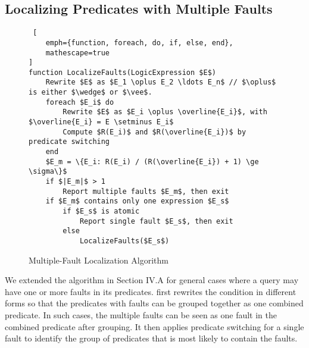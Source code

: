 \subsection{Localizing Predicates with Multiple Faults}

\begin{figure}[t]
    \centering
\begin{lstlisting} [
    emph={function, foreach, do, if, else, end},
	mathescape=true
]
function LocalizeFaults(LogicExpression $E$)
    Rewrite $E$ as $E_1 \oplus E_2 \ldots E_n$ // $\oplus$ is either $\wedge$ or $\vee$.
    foreach $E_i$ do
        Rewrite $E$ as $E_i \oplus \overline{E_i}$, with $\overline{E_i} = E \setminus E_i$
        Compute $R(E_i)$ and $R(\overline{E_i})$ by predicate switching
    end
    $E_m = \{E_i: R(E_i) / (R(\overline{E_i}) + 1) \ge \sigma\}$
    if $|E_m|$ > 1
        Report multiple faults $E_m$, then exit
    if $E_m$ contains only one expression $E_s$
        if $E_s$ is atomic
            Report single fault $E_s$, then exit
        else
            LocalizeFaults($E_s$)
\end{lstlisting}
     \caption{Multiple-Fault Localization Algorithm}
     \label{fig:algorithm-multiplefaults}
\end{figure}


We extended the algorithm in Section IV.A for general cases
where a query may have one or more faults in its
predicates. \tool{} first rewrites the  condition
in different forms so that the predicates with faults can be grouped
together as one combined predicate. In such cases, the multiple faults
can be seen as one fault in the combined predicate after grouping. It
then applies predicate switching for a single fault to identify the
group of predicates that is most likely to contain the faults.

